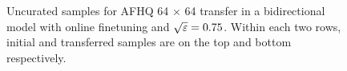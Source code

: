 \documentclass{article}
\begin{document}
\begin{figure}[htbp]
    \hfill
    \caption{Uncurated samples for AFHQ 64 $\times$ 64 transfer in a bidirectional model with online finetuning and $\sqrt{\varepsilon}=0.75$. Within each two rows, initial and transferred samples are on the top and bottom respectively.} 
    \label{fig:afhq64_bidirectional_online_ema} 
\end{figure}
\end{document}

